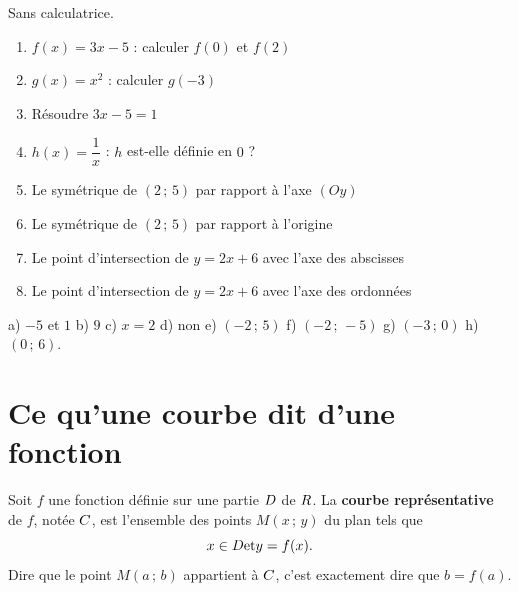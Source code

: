 \begin{automatismes}
Sans calculatrice.

\begin{enumerate}[label=\textbf{\alph*)}, leftmargin=*, itemsep=0.25em]
  \item $f(x) = 3x-5$ : calculer $f(0)$ et $f(2)$
  \item $g(x) = x^{2}$ : calculer $g(-3)$
  \item Résoudre $3x-5 = 1$
  \item $h(x) = \dfrac{1}{x}$ : $h$ est-elle définie en $0$ ?
  \item Le symétrique de $(2\,;\,5)$ par rapport à l'axe $(Oy)$
  \item Le symétrique de $(2\,;\,5)$ par rapport à l'origine
  \item Le point d'intersection de $y = 2x+6$ avec l'axe des abscisses
  \item Le point d'intersection de $y = 2x+6$ avec l'axe des ordonnées
\end{enumerate}
\end{automatismes}

\begin{corrige}[automatismes]
a) $-5$ et $1$ \quad b) $9$ \quad c) $x = 2$ \quad d) non \quad
e) $(-2\,;\,5)$ \quad f) $(-2\,;\,-5)$ \quad g) $(-3\,;\,0)$ \quad
h) $(0\,;\,6)$.
\end{corrige}

\section{Ce qu'une courbe dit d'une fonction}

\begin{definition}
Soit $f$ une fonction définie sur une partie $D$ de $R$. La
\textbf{courbe représentative} de $f$, notée $C$, est l'ensemble des points
$M(x\,;\,y)$ du plan tels que
\[
  x \in D \text{et} y = f(x).
\]
Dire que le point $M(a\,;\,b)$ appartient à $C$, c'est exactement dire que
$b = f(a)$.
\end{definition}

